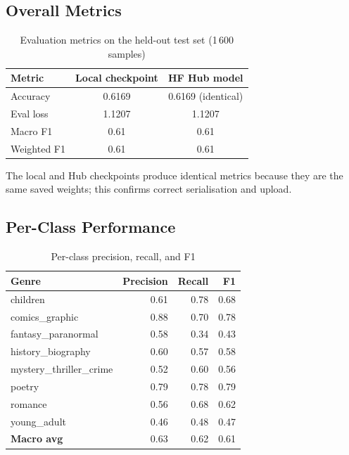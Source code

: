 \documentclass[12pt,a4paper]{article}
\begin{document}
\subsection{Overall Metrics}

\begin{table}[h]
\centering
\caption{Evaluation metrics on the held-out test set (1\,600 samples)}
\begin{tabular}{lcc}
\toprule
\textbf{Metric}   & \textbf{Local checkpoint} & \textbf{HF Hub model} \\
\midrule
Accuracy          & 0.6169                    & 0.6169 (identical) \\
Eval loss         & 1.1207                    & 1.1207 \\
Macro F1          & 0.61                      & 0.61 \\
Weighted F1       & 0.61                      & 0.61 \\
\bottomrule
\end{tabular}
\end{table}

The local and Hub checkpoints produce identical metrics because they are the
same saved weights; this confirms correct serialisation and upload.

\subsection{Per-Class Performance}

\begin{table}[h]
\centering
\caption{Per-class precision, recall, and F1}
\begin{tabular}{lrrr}
\toprule
\textbf{Genre}             & \textbf{Precision} & \textbf{Recall} & \textbf{F1} \\
\midrule
children                   & 0.61 & 0.78 & 0.68 \\
comics\_graphic            & 0.88 & 0.70 & 0.78 \\
fantasy\_paranormal        & 0.58 & 0.34 & 0.43 \\
history\_biography         & 0.60 & 0.57 & 0.58 \\
mystery\_thriller\_crime   & 0.52 & 0.60 & 0.56 \\
poetry                     & 0.79 & 0.78 & 0.79 \\
romance                    & 0.56 & 0.68 & 0.62 \\
young\_adult               & 0.46 & 0.48 & 0.47 \\
\midrule
\textbf{Macro avg}         & 0.63 & 0.62 & 0.61 \\
\bottomrule
\end{tabular}
\end{table}
\end{document}
